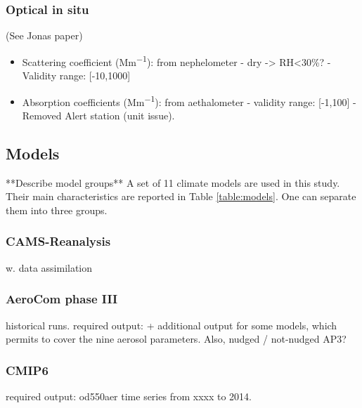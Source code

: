 \documentclass[journal abbreviation, manuscript]{copernicus}
\begin{document}
\subsubsection{Optical in situ}
(See Jonas paper)
\begin{itemize}
 \item Scattering coefficient (\unit{Mm^{-1}}): from nephelometer - dry -> RH<30\%? - Validity range: [-10,1000]
 \item Absorption coefficients (\unit{Mm^{-1}}): from aethalometer - validity range: [-1,100] - Removed Alert station (unit issue).
\end{itemize}

\subsection{Models}
**Describe model groups**
A set of 11 climate models are used in this study. Their main characteristics are reported in Table \ref{table:models}.  One can separate them into three groups.

\subsubsection{CAMS-Reanalysis}
w. data assimilation

\subsubsection{AeroCom phase III}
historical runs.
required output: + additional output for some models, which permits to cover the nine aerosol parameters.
Also, nudged / not-nudged AP3?

\subsubsection{CMIP6}
required output: od550aer time series from xxxx to 2014.
\end{document}
